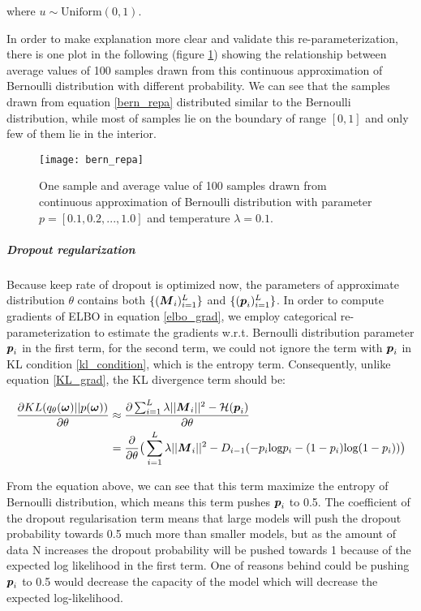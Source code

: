 where $u \sim \text{Uniform}(0,1)$. 

In order to make explanation more clear and validate this re-parameterization, there is one plot in the following (figure \ref{fig:bern_repa}) showing the relationship between average values of 100 samples drawn from this continuous approximation of Bernoulli distribution with different probability. We can see that the samples drawn from equation \ref{bern_repa} distributed similar to the Bernoulli distribution, while most of samples lie on the boundary of range $[0,1]$ and only few of them lie in the interior.
\begin{figure}[h!]
	\begin{center}
		\texttt{[image: bern\_repa]}
		\caption{One sample and average value of 100 samples drawn from continuous approximation of Bernoulli distribution with parameter $p = [0.1, 0.2, ..., 1.0]$ and temperature $ \lambda =0.1$.}		
		\label{fig:bern_repa}
	\end{center}
\end{figure}

\subparagraph{Dropout regularization}
Because keep rate of dropout is optimized now, the parameters of approximate distribution $\theta$ contains both $\{ (\boldsymbol M_i)_{i=1}^{L} \}$ and $\{(\boldsymbol p_i)_{i=1}^{L} \}$. In order to compute gradients of ELBO in equation \ref{elbo_grad}, we employ categorical re-parameterization to estimate the gradients w.r.t. Bernoulli distribution parameter $\boldsymbol p_i$ in the first term, for the second term, we could not ignore the term with $\boldsymbol p_i$ in KL condition \ref{kl_condition}, which is the entropy term. Consequently, unlike equation \ref{KL_grad}, the KL divergence term should be:

\begin{equation} 
\begin{aligned}\label{KL_grad_concrete}
\frac{\partial KL(q_{\theta}(\boldsymbol \omega)||p(\boldsymbol \omega))}{\partial \theta} 
&\approx \frac{\partial \sum_{i=1}^{L}\lambda||\boldsymbol M_{i}||^{2}- \mathcal H(\boldsymbol p_{i})}{\partial \theta}  \\
&= \frac{\partial}{\partial \theta} \big( \sum_{i=1}^{L}\lambda||\boldsymbol M_{i}||^{2}- D_{i-1}(-p_{i}\text{log}p_{i} - (1-p_{i})\text{log}(1-p_{i}))\big)
\end{aligned}
\end{equation}

From the equation above, we can see that this term maximize the entropy of Bernoulli distribution, which means this term pushes $\boldsymbol p_i$ to 0.5. The coefficient of the dropout regularisation term means that large models will push the dropout probability towards 0.5 much more than smaller models, but as the amount of data N increases the dropout probability will be pushed towards 1 because of the expected log likelihood in the first term. One of reasons behind could be pushing $\boldsymbol p_i$ to 0.5 would decrease the capacity of the model which will decrease the expected log-likelihood. 

